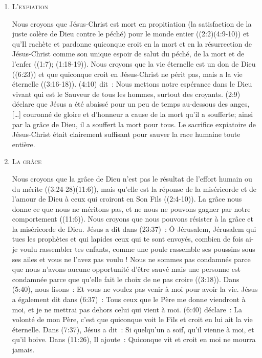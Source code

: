 \begin{enumerate}
  \item  \textsc{L'expiation}

\nobreak
Nous croyons que Jésus-Christ est mort en propitiation
 (la satisfaction de la juste colère de Dieu contre le péché)
 \og pour le monde entier \fg{} ((2:2)(4:9-10))
 et qu'Il rachète et pardonne quiconque croit en la mort et en la résurrection
 de Jésus-Christ comme son unique espoir de salut du péché, 
 de la mort et de l'enfer ((1:7); (1:18-19)).
 Nous croyons que la vie éternelle est un don de Dieu ((6:23))
 et que \og quiconque croit \fg{} en Jésus-Christ ne périt pas,
 mais a la vie éternelle ((3:16-18)).
 (4:10) dit~:
 \og Nous mettons notre espérance dans le Dieu vivant qui est le Sauveur de tous les hommes,
 surtout des croyants. \fg{}
 (2:9) déclare que Jésus \og a été abaissé pour un peu de temps au-dessous des anges,
 [\dots{}] couronné de gloire et d'honneur a cause de la mort qu'il a soufferte;
 ainsi par la grâce de Dieu, il a souffert la mort pour tous. \fg{}
 Le sacrifice expiatoire de Jésus-Christ était clairement suffisant pour sauver
 la race humaine toute entière.


  \item  \textsc{La grâce}

\nobreak
Nous croyons que la grâce de Dieu n'est pas le résultat de l'effort humain ou du mérite
 ((3:24-28)(11:6)), mais qu'elle est la réponse
 de la miséricorde et de l'amour de Dieu à ceux qui croiront en Son Fils
 ((2:4-10)).
 La grâce nous donne 
 ce que nous ne méritons pas, et ne nous ne pouvons gagner par notre comportement
 ((11:6)).
 Nous croyons que nous pouvons résister à la grâce et la miséricorde de Dieu.
 Jésus a dit dans (23:37)~:
 \og Ô Jérusalem, Jérusalem qui tues les prophètes
 et qui lapides ceux qui te sont envoyés, combien de fois ai-je voulu rassembler tes enfants,
 comme une poule rassemble ses poussins sous ses ailes et vous ne l'avez pas voulu ! \fg{}
 Nous ne sommes pas condamnés parce que nous n'avons aucune opportunité d'être sauvé
 mais une personne est condamnée parce que qu'elle fait le choix de ne pas croire
 ((3:18)).
 Dans (5:40), nous lisons~:
 \og Et vous ne voulez pas venir à moi pour avoir la vie. \fg{}
 Jésus a également dit dans (6:37)~:
 \og Tous ceux que le Père me donne viendront à moi,
 et je ne mettrai pas dehors celui qui vient à moi. \fg{}
 (6:40) déclare~:
 \og La volonté de mon Père, c'est que quiconque voit le Fils
 et croit en lui ait la vie éternelle. \fg{}
 Dans (7:37), Jésus a dit~:
 \og Si quelqu'un a soif, qu'il vienne à moi, et qu'il boive. \fg{}
 Dans (11:26), Il ajoute~:
 \og Quiconque vit et croit en moi ne mourra jamais. \fg{}


\end{enumerate}
